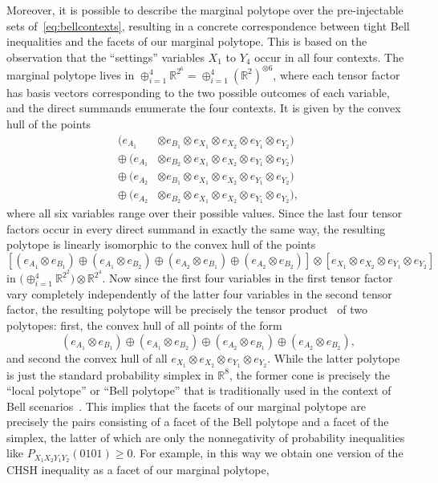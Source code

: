 \documentclass[aps,english,superscriptaddress,onecolumn,twoside,longbibliography,pra,floatfix,fleqn,nofootinbib]{revtex4-1}%
\theoremstyle{definition}
\begin{document}
Moreover, it is possible to describe the marginal polytope over the pre-injectable sets of~\cref{eq:bellcontexts}, resulting in a concrete correspondence between tight Bell inequalities and the facets of our marginal polytope. This is based on the observation that the ``settings'' variables $X_1$ to $Y_4$ occur in all four contexts. The marginal polytope lives in $\oplus_{i=1}^4 \mathbb{R}^{2^6} = \oplus_{i=1}^4 (\mathbb{R}^2)^{\otimes 6}$, where each tensor factor has basis vectors corresponding to the two possible outcomes of each variable, and the direct summands enumerate the four contexts. It is given by the convex hull of the points
\begin{align*}
	(e_{A_1} & \otimes e_{B_1} \otimes e_{X_1} \otimes e_{X_2} \otimes e_{Y_1} \otimes e_{Y_2}) \\
	\oplus\: (e_{A_1} & \otimes e_{B_2} \otimes e_{X_1} \otimes e_{X_2} \otimes e_{Y_1} \otimes e_{Y_2}) \\
	\oplus\: (e_{A_2} & \otimes e_{B_1} \otimes e_{X_1} \otimes e_{X_2} \otimes e_{Y_1} \otimes e_{Y_2}) \\
	\oplus\: (e_{A_2} & \otimes e_{B_2} \otimes e_{X_1} \otimes e_{X_2} \otimes e_{Y_1} \otimes e_{Y_2}),
\end{align*}
where all six variables range over their possible values. Since the last four tensor factors occur in every direct summand in exactly the same way, the resulting polytope is linearly isomorphic to the convex hull of the points
\[
	\left[ (e_{A_1} \otimes e_{B_1}) \oplus (e_{A_1} \otimes e_{B_2}) \oplus (e_{A_2} \otimes e_{B_1}) \oplus (e_{A_2} \otimes e_{B_2})\right] \otimes \left[ e_{X_1} \otimes e_{X_2} \otimes e_{Y_1} \otimes e_{Y_2}\right]
\]
in $\big(\oplus_{i=1}^4 \mathbb{R}^{2^2}\big)\otimes \mathbb{R}^{2^4}$. Now since the first four variables in the first tensor factor vary completely independently of the latter four variables in the second tensor factor, the resulting polytope will be precisely the tensor product~\cite{namioka_tensor_1969,bogart_hom_2013} of two polytopes: first, the convex hull of all points of the form
\[
	(e_{A_1} \otimes e_{B_1}) \oplus (e_{A_1} \otimes e_{B_2}) \oplus (e_{A_2} \otimes e_{B_1}) \oplus (e_{A_2} \otimes e_{B_2}),
\]
and second the convex hull of all $e_{X_1} \otimes e_{X_2} \otimes e_{Y_1} \otimes e_{Y_2}$. While the latter polytope is just the standard probability simplex in $\mathbb{R}^8$, the former cone is precisely the ``local polytope'' or ``Bell polytope'' that is traditionally used in the context of Bell scenarios~\cite[Sec.~II.B]{Brunner2013Bell}. This implies that the facets of our marginal polytope are precisely the pairs consisting of a facet of the Bell polytope and a facet of the simplex, the latter of which are only the nonnegativity of probability inequalities like $P_{X_1X_2Y_1Y_2}(0101)\geq 0$. For example, in this way we obtain one version of the CHSH inequality as a facet of our marginal polytope,
\end{document}
